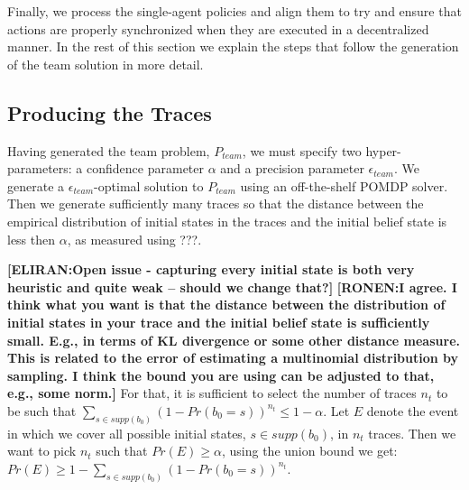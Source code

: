 \documentclass[letterpaper]{article} %
\newcommand{\eliran}[1]{\textbf{[\color{red}ELIRAN:#1]}}
\newcommand{\ronen}[1]{\textbf{[\color{blue}RONEN:#1]}}
\begin{document}
Finally, we process the single-agent policies and align them to try and ensure that actions are properly synchronized when they are executed in a decentralized manner. 
In the rest of this section we explain the steps that follow the
generation of the team solution in more detail.


\subsection{Producing the Traces}

Having generated the team problem, $P_{team}$, we 
must specify two hyper-parameters: a confidence parameter $\alpha$ and a precision parameter $\epsilon_{team}$. We generate a $\epsilon_{team}$-optimal solution
to $P_{team}$ using an off-the-shelf POMDP solver.
Then we generate sufficiently many traces so that the distance between the
empirical distribution of initial states in the traces and the initial belief state is less then $\alpha$,
as measured using ???.

\eliran{Open issue - capturing every initial state is both very heuristic and quite weak -- should we change that?}
\ronen{I agree. I think what you want is that the distance between the
distribution of initial states in your trace and the initial belief state is
sufficiently small. E.g., in terms of KL divergence or some other distance measure. This is related to the error of estimating a multinomial distribution by sampling. I think the bound you are using can be adjusted to that,
e.g., some norm.}
For that, it is sufficient to select the number of traces $n_t$ to be such that $\sum_{s\in supp(b_0)}(1-Pr(b_0=s))^{n_t} \leq 1-\alpha$.
Let $E$ denote the event in which we cover all possible initial states, $s \in supp(b_0)$, in $n_t$ traces. Then we want to pick $n_t$ such that $Pr(E)\geq \alpha$, using the union bound we get: $Pr(E)\geq 1-\sum_{s\in supp(b_0)}(1-Pr(b_0=s))^{n_t}$.
\end{document}
